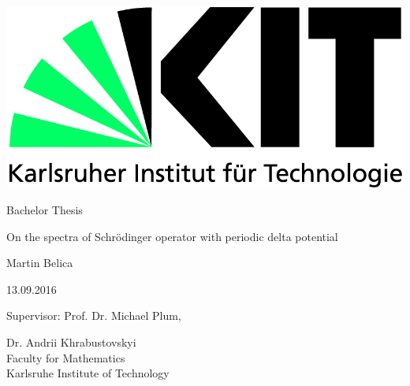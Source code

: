 \begin{titlepage}
  \includegraphics[scale=0.45]{kit-logo.jpg}
  \vspace*{2cm} 

  \begin{center} \large 
    
    Bachelor Thesis
    \vspace*{2cm}

    {\huge On the spectra of Schrödinger operator with periodic delta potential}
    \vspace*{2.5cm}

    Martin Belica
    \vspace*{0.125cm}

    13.09.2016
    \vspace*{4.25cm}


    Supervisor: Prof. Dr. Michael Plum,
    \vspace*{0.125cm}
    
    Dr. Andrii Khrabustovskyi \\[1cm]
    Faculty for Mathematics \\[1cm]
	Karlsruhe Institute of Technology
  \end{center}
\end{titlepage}